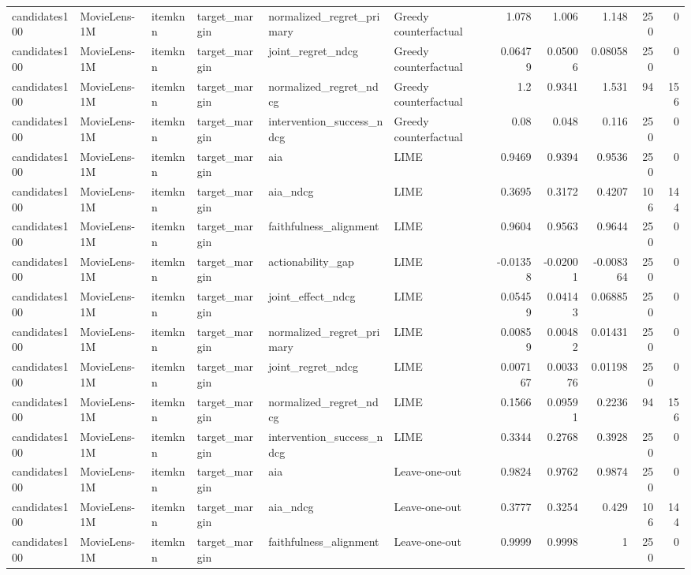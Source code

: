 \begin{table}[t]
{\begin{tabular}{llllllrrrrr}
candidates100 & MovieLens-1M & itemknn & target\_margin & normalized\_regret\_primary & Greedy counterfactual & 1.078 & 1.006 & 1.148 & 250 & 0 \\
candidates100 & MovieLens-1M & itemknn & target\_margin & joint\_regret\_ndcg & Greedy counterfactual & 0.06479 & 0.05006 & 0.08058 & 250 & 0 \\
candidates100 & MovieLens-1M & itemknn & target\_margin & normalized\_regret\_ndcg & Greedy counterfactual & 1.2 & 0.9341 & 1.531 & 94 & 156 \\
candidates100 & MovieLens-1M & itemknn & target\_margin & intervention\_success\_ndcg & Greedy counterfactual & 0.08 & 0.048 & 0.116 & 250 & 0 \\
candidates100 & MovieLens-1M & itemknn & target\_margin & aia & LIME & 0.9469 & 0.9394 & 0.9536 & 250 & 0 \\
candidates100 & MovieLens-1M & itemknn & target\_margin & aia\_ndcg & LIME & 0.3695 & 0.3172 & 0.4207 & 106 & 144 \\
candidates100 & MovieLens-1M & itemknn & target\_margin & faithfulness\_alignment & LIME & 0.9604 & 0.9563 & 0.9644 & 250 & 0 \\
candidates100 & MovieLens-1M & itemknn & target\_margin & actionability\_gap & LIME & -0.01358 & -0.02001 & -0.008364 & 250 & 0 \\
candidates100 & MovieLens-1M & itemknn & target\_margin & joint\_effect\_ndcg & LIME & 0.05459 & 0.04143 & 0.06885 & 250 & 0 \\
candidates100 & MovieLens-1M & itemknn & target\_margin & normalized\_regret\_primary & LIME & 0.00859 & 0.00482 & 0.01431 & 250 & 0 \\
candidates100 & MovieLens-1M & itemknn & target\_margin & joint\_regret\_ndcg & LIME & 0.007167 & 0.003376 & 0.01198 & 250 & 0 \\
candidates100 & MovieLens-1M & itemknn & target\_margin & normalized\_regret\_ndcg & LIME & 0.1566 & 0.09591 & 0.2236 & 94 & 156 \\
candidates100 & MovieLens-1M & itemknn & target\_margin & intervention\_success\_ndcg & LIME & 0.3344 & 0.2768 & 0.3928 & 250 & 0 \\
candidates100 & MovieLens-1M & itemknn & target\_margin & aia & Leave-one-out & 0.9824 & 0.9762 & 0.9874 & 250 & 0 \\
candidates100 & MovieLens-1M & itemknn & target\_margin & aia\_ndcg & Leave-one-out & 0.3777 & 0.3254 & 0.429 & 106 & 144 \\
candidates100 & MovieLens-1M & itemknn & target\_margin & faithfulness\_alignment & Leave-one-out & 0.9999 & 0.9998 & 1 & 250 & 0 \\

\end{tabular}}
\end{table}

